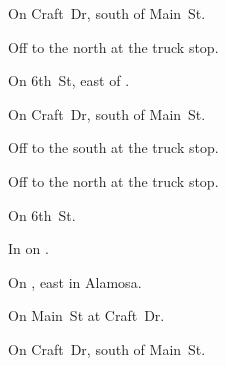 
\begin{LocationList}

On Craft~Dr, south of   Main~St.

Off  to the north at the truck stop.

On  6th~St, east of .

On Craft~Dr, south of   Main~St.

\Location{\GarageHQ \Garage}
Off  to the south at the truck stop.

Off  to the north at the truck stop.

\Location{\RecruitmentAgency \Recruitment}
On  6th~St.

In  on .

\Location{\TruckStop \Gas \Rest \Service}
On , east in Alamosa.

On   Main~St at Craft~Dr.

On Craft~Dr, south of   Main~St.

\end{LocationList}
